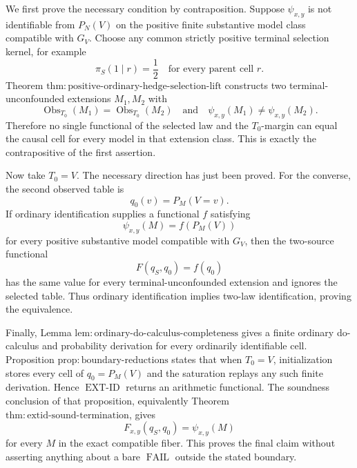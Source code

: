 We first prove the necessary condition by contraposition. Suppose \(\psi_{x,y}\) is not identifiable from \(P_N(V)\) on the positive finite substantive model class compatible with \(G_V\). Choose any common strictly positive terminal selection kernel, for example
\[
 \pi_S(1\mid r)=\frac12
 \quad\text{for every parent cell }r.
\]
Theorem \(\mathrm{thm{:}positive\text{-}ordinary\text{-}hedge\text{-}selection\text{-}lift}\) constructs two terminal-unconfounded extensions \(M_1,M_2\) with
\[
 \operatorname{Obs}_{T_0}(M_1)=\operatorname{Obs}_{T_0}(M_2)
 \quad\text{and}\quad
 \psi_{x,y}(M_1)\ne\psi_{x,y}(M_2).
\]
Therefore no single functional of the selected law and the \(T_0\)-margin can equal the causal cell for every model in that extension class. This is exactly the contrapositive of the first assertion.

Now take \(T_0=V\). The necessary direction has just been proved. For the converse, the second observed table is
\[
 q_0(v)=P_M(V=v).
\]
If ordinary identification supplies a functional \(f\) satisfying
\[
 \psi_{x,y}(M)=f(P_M(V))
\]
for every positive substantive model compatible with \(G_V\), then the two-source functional
\[
 F(q_S,q_0)=f(q_0)
\]
has the same value for every terminal-unconfounded extension and ignores the selected table. Thus ordinary identification implies two-law identification, proving the equivalence.

Finally, Lemma \(\mathrm{lem{:}ordinary\text{-}do\text{-}calculus\text{-}completeness}\) gives a finite ordinary do-calculus and probability derivation for every ordinarily identifiable cell. Proposition \(\mathrm{prop{:}boundary\text{-}reductions}\) states that when \(T_0=V\), initialization stores every cell of \(q_0=P_M(V)\) and the saturation replays any such finite derivation. Hence \(\operatorname{EXT\text{-}ID}\) returns an arithmetic functional. The soundness conclusion of that proposition, equivalently Theorem \(\mathrm{thm{:}extid\text{-}sound\text{-}termination}\), gives
\[
 F_{x,y}(q_S,q_0)=\psi_{x,y}(M)
\]
for every \(M\) in the exact compatible fiber. This proves the final claim without asserting anything about a bare \(\operatorname{FAIL}\) outside the stated boundary.